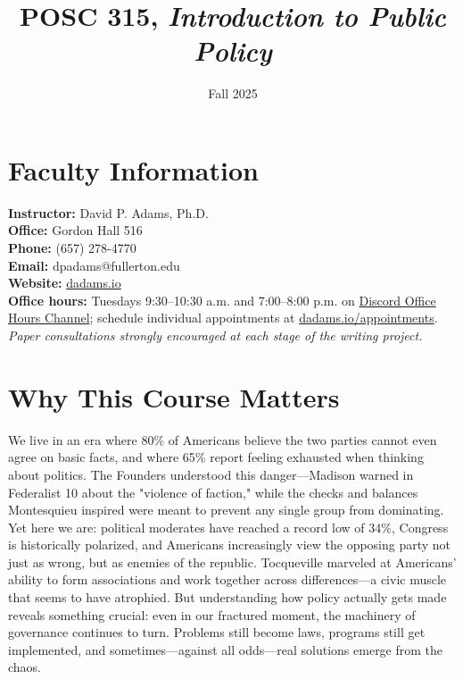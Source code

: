 \documentclass[12pt]{article}     %
\title{POSC 315, \textit{Introduction to Public Policy}} %
\author{}                         %
\date{Fall 2025}                  %
\begin{document}
\maketitle

\section{Faculty Information}
\noindent \textbf{Instructor:} David P. Adams, Ph.D. \\
\noindent \textbf{Office:} Gordon Hall 516 \\
\noindent \textbf{Phone:} (657) 278-4770 \\
\noindent \textbf{Email:} dpadams@fullerton.edu \\
\noindent \textbf{Website:} \href{https://dadams.io}{dadams.io} \\
\noindent \textbf{Office hours:} Tuesdays 9:30--10:30 a.m. and 7:00--8:00 p.m. on \href{https://discord.com/channels/1128747433636135113/1154048074172354600}{Discord Office Hours Channel}; schedule individual appointments at \href{https://dadams.io/appointments}{dadams.io/appointments}. \textit{Paper consultations strongly encouraged at each stage of the writing project.}

\section{Why This Course Matters}

We live in an era where 80\% of Americans believe the two parties cannot even agree on basic facts, and where 65\% report feeling exhausted when thinking about politics. The Founders understood this danger---Madison warned in Federalist 10 about the "violence of faction," while the checks and balances Montesquieu inspired were meant to prevent any single group from dominating. Yet here we are: political moderates have reached a record low of 34\%, Congress is historically polarized, and Americans increasingly view the opposing party not just as wrong, but as enemies of the republic. Tocqueville marveled at Americans' ability to form associations and work together across differences---a civic muscle that seems to have atrophied. But understanding how policy actually gets made reveals something crucial: even in our fractured moment, the machinery of governance continues to turn. Problems still become laws, programs still get implemented, and sometimes---against all odds---real solutions emerge from the chaos.
\end{document}
